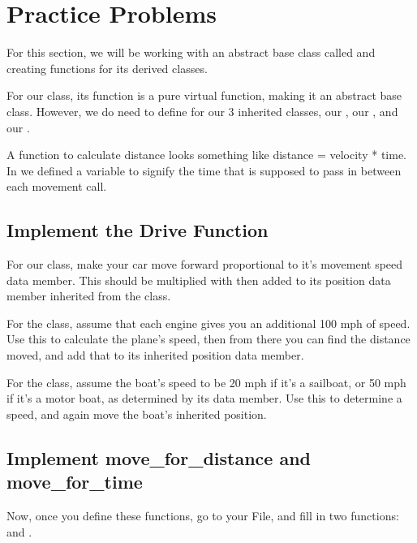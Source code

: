 \documentclass{tufte-handout}
\begin{document}
\section{Practice Problems}
For this section, we will be working with an abstract base class called  and creating functions for its derived classes.

For our  class, its  function is a pure virtual function, making it an abstract base class.
However, we do need to define  for our 3 inherited classes, our , our , and our .

A function to calculate distance looks something like distance = velocity * time. In  we defined a  variable to signify the time that is supposed to pass in between each movement call.

\subsection{Implement the Drive Function}
For our  class, make your car move forward proportional to it's movement speed data member.
This should be multiplied with  then added to its position data member inherited from the  class. \newline \medskip

For the  class, assume that each engine gives you an additional 100 mph of speed.
Use this to calculate the plane's speed, then from there you can find the distance moved, and add that to its inherited position data member. \newline \medskip

For the  class, assume the boat's speed to be 20 mph if it's a sailboat, or 50 mph if it's a motor boat, as determined by its  data member.
Use this to determine a speed, and again move the boat's inherited position.

\subsection{Implement move\_for\_distance and move\_for\_time}
Now, once you define these functions, go to your  File, and fill in two functions:
 and . \newline \medskip
\end{document}
